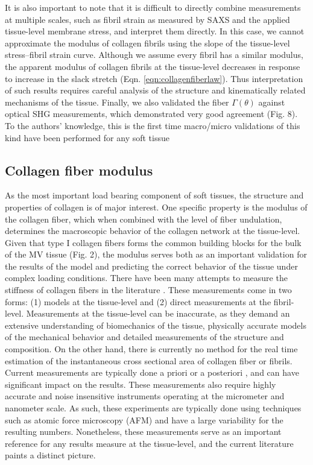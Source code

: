     
    It is also important to note that it is difficult to directly combine measurements at multiple scales, such as fibril strain as measured by SAXS and the applied tissue-level membrane stress, and interpret them directly. In this case, we cannot approximate the modulus of collagen fibrils using the slope of the tissue-level stress–fibril strain curve. Although we assume every fibril has a similar modulus, the apparent modulus of collagen fibrils at the tissue-level decreases in response to increase in the slack stretch (Eqn. \ref{eqn:collagenfiberlaw}). Thus interpretation of such results requires careful analysis of the structure and kinematically related mechanisms of the tissue. Finally, we also validated the fiber $\Gamma(\theta)$ against optical SHG measurements, which demonstrated very good agreement (Fig. 8). To the authors’ knowledge, this is the first time macro/micro validations of this kind have been performed for any soft tissue
    
    


\subsection{Collagen fiber modulus}

    As the most important load bearing component of soft tissues, the structure and properties of collagen is of major interest. One specific property is the modulus of the collagen fiber, which when combined with the level of fiber undulation, determines the macroscopic behavior of the collagen network at the tissue-level. Given that type I collagen fibers forms the common building blocks for the bulk of the MV tissue (Fig. 2), the modulus serves both as an important validation for the results of the model and predicting the correct behavior of the tissue under complex loading conditions. There have been many attempts to measure the stiffness of collagen fibers in the literature \cite{shen_stress_2008}\cite{gentleman_mechanical_2003}\cite{eppell_nano_2006}\cite{yang_mechanical_2008}\cite{yang_micromechanical_2007}\cite{wenger_mechanical_2007}. These measurements come in two forms: (1) models at the tissue-level and (2) direct measurements at the fibril-level. Measurements at the tissue-level can be inaccurate, as they demand an extensive understanding of biomechanics of the tissue, physically accurate models of the mechanical behavior and detailed measurements of the structure and composition. On the other hand, there is currently no method for the real time estimation of the instantaneous cross sectional area of collagen fiber or fibrils. Current measurements are typically done a priori \cite{gentleman_mechanical_2003} or a posteriori \cite{eppell_nano_2006}, and can have significant impact on the results. These measurements also require highly accurate and noise insensitive instruments operating at the micrometer and nanometer scale. As such, these experiments are typically done using techniques such as atomic force microscopy (AFM) and have a large variability for the resulting numbers. Nonetheless, these measurements serve as an important reference for any results measure at the tissue-level, and the current literature paints a distinct picture.


